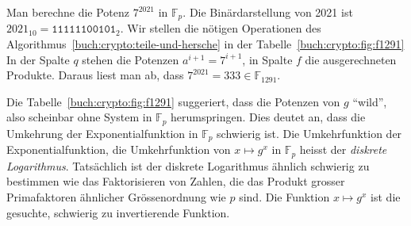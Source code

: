 \begin{beispiel}
Man berechne die Potenz $7^{2021}$ in $\mathbb{F}_p$.
Die Binärdarstellung von 2021 ist $2021_{10}=\texttt{11111100101}_2$.
Wir stellen die nötigen Operationen des
Algorithmus~\ref{buch:crypto:teile-und-hersche} in der 
Tabelle~\ref{buch:crypto:fig:f1291}
In der Spalte $q$ stehen die Potenzen $a^{i+1}=7^{i+1}$, in Spalte $f$ die
ausgerechneten Produkte.
Daraus liest man ab, dass $7^{2021}=333\in\mathbb{F}_{1291}$.
\end{beispiel}

Die Tabelle~\ref{buch:crypto:fig:f1291} suggeriert, dass die Potenzen von $g$
``wild'', also scheinbar ohne System in $\mathbb{F}_p$ herumspringen.
Dies deutet an, dass die Umkehrung der Exponentialfunktion in $\mathbb{F}_p$
schwierig ist.
Die Umkehrfunktion der Exponentialfunktion, die Umkehrfunktion von 
$x\mapsto g^x$ in $\mathbb{F}_p$ heisst der {\em diskrete Logarithmus}.
%
Tatsächlich ist der diskrete Logarithmus ähnlich schwierig zu bestimmen
wie das Faktorisieren von Zahlen, die das Produkt grosser
Primafaktoren ähnlicher Grössenordnung wie $p$ sind.
Die Funktion $x\mapsto g^x$ ist die gesuchte, schwierig zu invertierende
Funktion.

%


